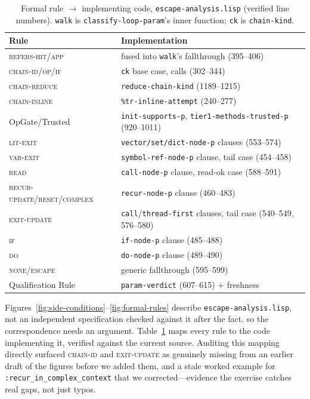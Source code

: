\documentclass[sigplan,review,anonymous]{acmart}
\begin{document}
\begin{table}[h]
  \caption{Formal rule $\to$ implementing code, \texttt{escape-analysis.lisp} (verified line numbers). \texttt{walk} is \texttt{classify-loop-param}'s inner function; \texttt{ck} is \texttt{chain-kind}.}
  \label{tab:fidelity}
  \footnotesize
  \setlength{\tabcolsep}{2.5pt}
  \begin{tabularx}{\columnwidth}{@{}lX@{}}
    \toprule
    Rule & Implementation \\
    \midrule
    \textsc{refers-hit/app} & fused into \texttt{walk}'s fallthrough (395--406) \\
    \textsc{chain-id/op/if} & \texttt{ck} base case, calls (302--344) \\
    \textsc{chain-reduce} & \texttt{reduce-chain-kind} (1189--1215) \\
    \textsc{chain-inline} & \texttt{\%tr-inline-attempt} (240--277) \\
    OpGate/Trusted & \texttt{init-supports-p}, \texttt{tier1-methods-trusted-p} (920--1011) \\
    \textsc{lit-exit} & \texttt{vector/set/dict-node-p} clauses (553--574) \\
    \textsc{var-exit} & \texttt{symbol-ref-node-p} clause, tail case (454--458) \\
    \textsc{read} & \texttt{call-node-p} clause, read-ok case (588--591) \\
    \textsc{recur-update/reset/complex} & \texttt{recur-node-p} clause (460--483) \\
    \textsc{exit-update} & \texttt{call}/\texttt{thread-first} clauses, tail case (540--549, 576--580) \\
    \textsc{if} & \texttt{if-node-p} clause (485--488) \\
    \textsc{do} & \texttt{do-node-p} clause (489--490) \\
    \textsc{none/escape} & generic fallthrough (595--599) \\
    Qualification Rule & \texttt{param-verdict} (607--615) + freshness \\
  \bottomrule
\end{tabularx}
\end{table}

Figures~\ref{fig:side-conditions}--\ref{fig:formal-rules} describe \texttt{escape-analysis.lisp}, not an independent specification checked against it after the fact, so the correspondence needs an argument. Table~\ref{tab:fidelity} maps every rule to the code implementing it, verified against the current source. Auditing this mapping directly surfaced \textsc{chain-id} and \textsc{exit-update} as genuinely missing from an earlier draft of the figures before we added them, and a stale worked example for \texttt{:recur\_in\_complex\_context} that we corrected---evidence the exercise catches real gaps, not just typos.
\end{document}
